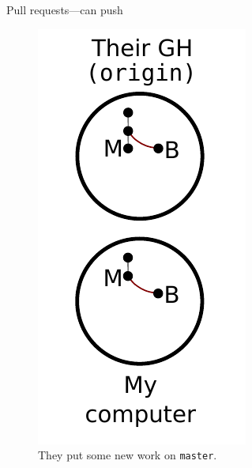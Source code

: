\begin{frame}{Pull requests---can push}
  \begin{figure}
    \includegraphics{push_005.pdf}
    \\ They put some new work on \texttt{master}.
    \\ \texttt{}
  \end{figure}
\end{frame}

